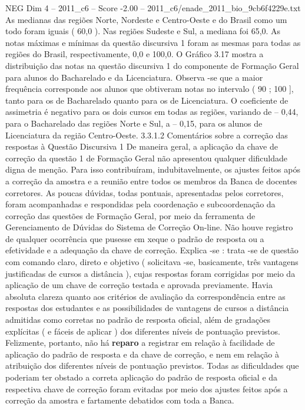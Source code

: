 \begin{textsample}{NEG Dim 4 – 2011\_c6 – Score -2.00 – 2011\_c6/enade\_2011\_bio\_9cb6f4229e.txt}
As medianas das regiões Norte, Nordeste e Centro-Oeste e do Brasil como um todo foram iguais ( 60,0 ).
Nas regiões Sudeste e Sul, a mediana foi 65,0.
As notas máximas e mínimas da questão discursiva 1 foram as mesmas para todas as regiões do Brasil, respectivamente, 0,0 e 100,0.
O Gráfico 3.17 mostra a distribuição das notas na questão discursiva 1 do componente de Formação Geral para alunos do Bacharelado e da Licenciatura.
Observa -se que a maior frequência corresponde aos alunos que obtiveram notas no intervalo ( 90 ; 100 ], tanto para os de Bacharelado quanto para os de Licenciatura.
O coeficiente de assimetria é negativo para os dois cursos em todas as regiões, variando de – 0,44, para o Bacharelado das regiões Norte e Sul, a – 0,15, para os alunos de Licenciatura da região Centro-Oeste. 3.3.1.2 Comentários sobre a correção das respostas à Questão Discursiva 1 De maneira geral, a aplicação da chave de correção da questão 1 de Formação Geral não apresentou qualquer dificuldade digna de menção.
Para isso contribuíram, indubitavelmente, os ajustes feitos após a correção da amostra e a reunião entre todos os membros da Banca de docentes corretores.
As poucas dúvidas, todas pontuais, apresentadas pelos corretores, foram acompanhadas e respondidas pela coordenação e subcoordenação da correção das questões de Formação Geral, por meio da ferramenta de Gerenciamento de Dúvidas do Sistema de Correção On-line.
Não houve registro de qualquer ocorrência que pusesse em xeque o padrão de resposta ou a efetividade e a adequação da chave de correção.
Explica -se : trata -se de questão com comando claro, direto e objetivo ( solicitava -se, basicamente, três vantagens justificadas de cursos a distância ), cujas respostas foram corrigidas por meio da aplicação de um chave de correção testada e aprovada previamente.
Havia absoluta clareza quanto aos critérios de avaliação da correspondência entre as respostas dos estudantes e as possibilidades de vantagens de cursos a distância admitidas como corretas no padrão de resposta oficial, além de gradações explícitas ( e fáceis de aplicar ) dos diferentes níveis de pontuação previstos.
Felizmente, portanto, não há \textbf{reparo} a registrar em relação à facilidade de aplicação do padrão de resposta e da chave de correção, e nem em relação à atribuição dos diferentes níveis de pontuação previstos.
Todas as dificuldades que poderiam ter obstado a correta aplicação do padrão de resposta oficial e da respectiva chave de correção foram evitadas por meio dos ajustes feitos após a correção da amostra e fartamente debatidos com toda a Banca.

\end{textsample}
